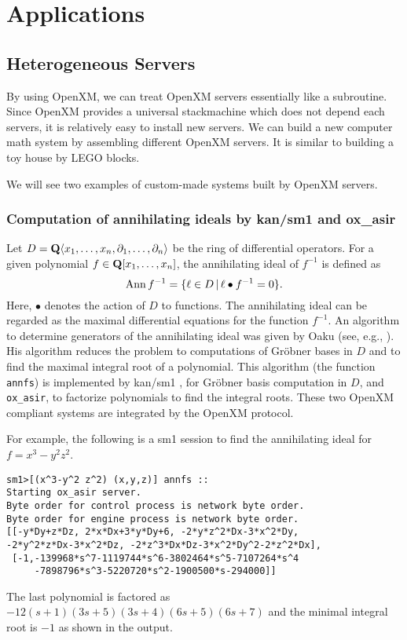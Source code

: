 \section{Applications}

\subsection{Heterogeneous Servers}

\def\pd#1{ \partial_{#1} }

By using OpenXM, we can treat OpenXM servers essentially 
like a subroutine.
Since OpenXM provides a universal stackmachine which does not
depend each servers, 
it is relatively easy to install new servers.
We can build a new computer math system by assembling
different OpenXM servers.
It is similar to building a toy house by LEGO blocks.

We will see two examples of custom-made systems
built by OpenXM servers.

\subsubsection{Computation of annihilating ideals by kan/sm1 and ox\_asir}

Let $D = {\bf Q} \langle x_1, \ldots, x_n , \pd{1}, \ldots, \pd{n} \rangle$
be the ring of differential operators.
For a given polynomial
$ f \in {\bf Q}[x_1, \ldots, x_n] $,
the annihilating ideal of $f^{-1}$ is defined as
$$ {\rm Ann}\, f^{-1} = \{ \ell \in D \,|\,
  \ell \bullet f^{-1} = 0 \}.
$$
Here, $\bullet$ denotes the action of $D$ to functions.
The annihilating ideal can be regarded as the maximal differential
equations for the function $f^{-1}$.
An algorithm to determine generators of the annihilating ideal
was given by Oaku (see, e.g., \cite[5.3]{sst-book}).
His algorithm reduces the problem to computations of Gr\"obner bases
in $D$ and to find the maximal integral root of a polynomial.
This algorithm (the function {\tt annfs}) is implemented by
kan/sm1 \cite{kan}, for Gr\"obner basis computation in $D$, and
{\tt ox\_asir}, to factorize polynomials to find the integral
roots.
These two OpenXM compliant systems are integrated by
the OpenXM protocol.

For example, the following is a sm1 session to find the annihilating
ideal for $f = x^3 - y^2 z^2$.
\begin{verbatim}
sm1>[(x^3-y^2 z^2) (x,y,z)] annfs ::
Starting ox_asir server.
Byte order for control process is network byte order.
Byte order for engine process is network byte order.
[[-y*Dy+z*Dz, 2*x*Dx+3*y*Dy+6, -2*y*z^2*Dx-3*x^2*Dy, 
-2*y^2*z*Dx-3*x^2*Dz, -2*z^3*Dx*Dz-3*x^2*Dy^2-2*z^2*Dx], 
 [-1,-139968*s^7-1119744*s^6-3802464*s^5-7107264*s^4
     -7898796*s^3-5220720*s^2-1900500*s-294000]] 
\end{verbatim}
The last polynomial is factored as
$-12(s+1)(3s+5)(3s+4)(6s+5)(6s+7)$
and the minimal integral root is $-1$
as shown in the output.

